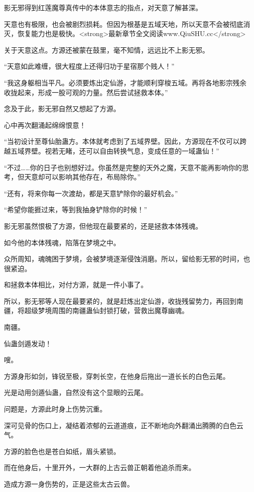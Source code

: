 \begin{this_body}
影无邪得到红莲魔尊真传中的本体意志的指点，对天意了解甚深。

天意也有极限，也会被剧烈损耗。但因为根基是五域天地，所以天意不会被彻底消灭，恢复能力也是极快。<strong>最新章节全文阅读www.QiuSHU.cc</strong>

关于天意这点。方源还被蒙在鼓里，毫不知情，远远比不上影无邪。

“天意如此难缠，很大程度上还得归功于星宿那个贱人！”

“我这身躯相当平凡。必须要炼出定仙游，才能顺利穿梭五域。再将各地影宗残余收拢起来，形成一股可观的力量。然后尝试拯救本体。”

念及于此，影无邪自然又想起了方源。

心中再次翻涌起绵绵恨意！

“当初设计至尊仙胎蛊方。本体就考虑到了五域界壁。因此，方源现在不仅可以跨越五域界壁。视若无睹，还可以自由转换气息，变成任意的一域蛊仙！”

“不过……你的日子也别想好过。你虽然是完整的天外之魔，天意不能再影响你的思考，但天意却可以影响其他存在，布局除你。”

“还有，将来你每一次渡劫，都是天意铲除你的最好机会。”

“希望你能捱过来，等到我抽身铲除你的时候！”

影无邪虽然恨极了方源，但他现在最要紧的，还是拯救本体残魂。

如今他的本体残魂，陷落在梦境之中。

众所周知，魂魄困于梦境，会被梦境逐渐侵蚀消磨。所以，留给影无邪的时间，也很紧迫。

和拯救本体相比，对付方源，就是一件小事了。

所以，影无邪等人现在最要紧的，就是赶炼出定仙游，收拢残留势力，再回到南疆，将超级梦境周围的南疆蛊仙封锁打破，营救出魔尊幽魂。

南疆。

仙蛊剑遁发动！

嗖。

方源身形如剑，锋锐至极，穿刺长空，在他身后拖出一道长长的白色云尾。

光是动用剑遁仙蛊，自然没有这个显眼的云尾。

问题是，方源此时身上伤势沉重。

深可见骨的伤口上，凝结着浓郁的云道道痕，正不断地向外翻涌出腾腾的白色云气。

方源的脸色也是苍白如纸，眉头紧锁。

而在他身后，十里开外，一大群的上古云兽正朝着他追杀而来。

造成方源一身伤势的，正是这些太古云兽。


\end{this_body}
